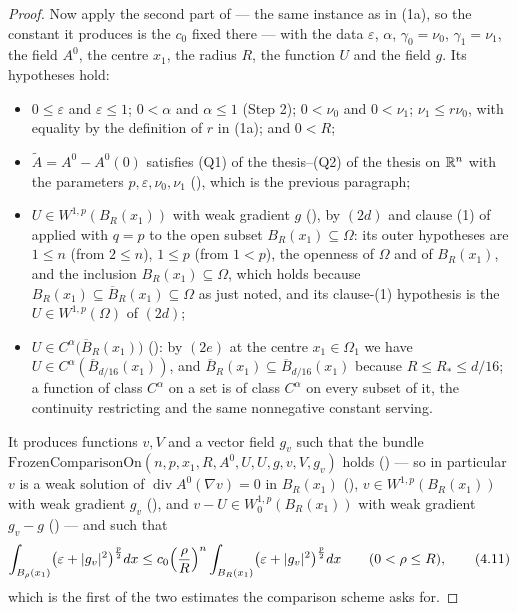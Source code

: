 \begin{proof}
Now apply the second part of  --- the same
instance as in (1a), so the constant it produces is the $c_0$ fixed there ---
with the data $\varepsilon$, $\alpha$, $\gamma_0=\nu_0$, $\gamma_1=\nu_1$, the
field $A^0$, the centre $x_1$, the radius $R$, the function $U$ and the field
$g$.  Its hypotheses hold:
\begin{itemize}
\item $0\le\varepsilon$ and $\varepsilon\le1$; $0<\alpha$ and $\alpha\le1$
  (Step 2); $0<\nu_0$ and $0<\nu_1$; $\nu_1\le r\nu_0$, with equality by the
  definition of $r$ in (1a); and $0<R$;
\item $\widetilde A=A^0-A^0(0)$ satisfies (Q1) of the thesis--(Q2) of the thesis on
  $\mathbb{R}^n$ with the parameters $p,\varepsilon,\nu_0,\nu_1$
  (), which is the previous paragraph;
\item $U\in W^{1,p}(B_R(x_1))$ with weak gradient $g$ (), by
  $(2d)$ and clause (1) of  applied with $q=p$ to
  the open subset $B_R(x_1)\subseteq\Omega$: its outer hypotheses are $1\le n$
  (from $2\le n$), $1\le p$ (from $1<p$), the openness of $\Omega$ and of
  $B_R(x_1)$, and the inclusion $B_R(x_1)\subseteq\Omega$, which holds because
  $B_R(x_1)\subseteq\overline B_R(x_1)\subseteq\Omega$ as just noted, and its
  clause-(1) hypothesis is the $U\in W^{1,p}(\Omega)$ of $(2d)$;
\item $U\in C^\alpha\bigl(\overline B_R(x_1)\bigr)$ ():
  by $(2e)$ at the centre $x_1\in\Omega_1$ we have
  $U\in C^\alpha(\overline B_{d/16}(x_1))$, and
  $\overline B_R(x_1)\subseteq\overline B_{d/16}(x_1)$ because
  $R\le R_\ast\le d/16$; a function of class $C^\alpha$ on a set is of class
  $C^\alpha$ on every subset of it, the continuity restricting and the same
  nonnegative constant serving.
\end{itemize}
It produces functions $v,V$ and a vector field $g_v$ such that the bundle
$\mathrm{FrozenComparisonOn}(n,p,x_1,R,A^0,U,U,g,v,V,g_v)$ holds
() --- so in particular $v$ is a weak solution of
$\operatorname{div}A^0(\nabla v)=0$ in $B_R(x_1)$
(), $v\in W^{1,p}(B_R(x_1))$ with weak gradient $g_v$
(), and $v-U\in W^{1,p}_0(B_R(x_1))$ with weak gradient
$g_v-g$ () --- and such that
\[
\int_{B_\rho(x_1)}\bigl(\varepsilon+|g_v|^2\bigr)^{\frac p2}dx
\le c_0\Bigl(\frac\rho R\Bigr)^{n}
\int_{B_R(x_1)}\bigl(\varepsilon+|g_v|^2\bigr)^{\frac p2}dx
\qquad(0<\rho\le R),
\tag{4.11}
\]
which is the first of the two estimates the comparison scheme asks for.


\end{proof}
